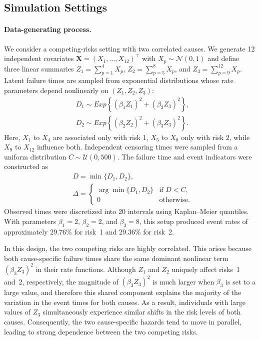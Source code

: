 \documentclass{article}
\theoremstyle{plain}
\theoremstyle{definition}
\theoremstyle{remark}
\begin{document}
\subsection{Simulation Settings}
\label{A.SimSettings}

\paragraph{Data-generating process.}
We consider a competing-risks setting with two correlated causes. We generate 12 independent covariates $\bm{X}=(X_1,\ldots,X_{12})^\top$ with $X_p\sim\mathcal{N}(0,1)$ and define three linear summaries
$Z_1=\sum_{p=1}^4 X_p$, $Z_2=\sum_{p=5}^8 X_p$, and $Z_3=\sum_{p=9}^{12} X_p$.
Latent failure times are sampled from exponential distributions whose rate parameters depend nonlinearly on $(Z_1,Z_2,Z_3)$:
\begin{align*}
    &D_1 \sim \mathit{Exp}\left\{ (\beta_1 Z_1)^2 + (\beta_3 Z_3)^2 \right\}, \\
    &D_2 \sim \mathit{Exp}\left\{ (\beta_2 Z_2)^2 + (\beta_3 Z_3)^2 \right\}. 
\end{align*}
Here, $X_1$ to $X_4$ are associated only with risk 1, $X_5$ to $X_8$ only with risk 2, while $X_9$ to $X_{12}$ influence both. Independent censoring times were sampled from a uniform distribution $C \sim \mathcal{U}(0, 500)$. The failure time and event indicators were constructed as
\begin{align*}
&D = \min\{D_1, D_2\},\\
&\Delta = 
\begin{cases}
    \arg\min\{D_1, D_2\} & \text{if } D < C, \\
    0 & \text{otherwise}.
\end{cases}
\end{align*}
Observed times were discretized into 20 intervals using Kaplan–Meier quantiles. With parameters $\beta_1=2$, $\beta_2=2$, and $\beta_3=8$, this setup produced event rates of approximately $29.76\%$ for risk~1 and $29.36\%$ for risk~2.

In this design, the two competing risks are highly correlated. 
This arises because both cause-specific failure times share the same  dominant nonlinear term $(\beta_3 Z_3)^2$ in their rate functions.
Although $Z_1$ and $Z_2$ uniquely affect risks~1 and~2, respectively, the magnitude of $(\beta_3 Z_3)^2$ is much larger when $\beta_3$ is set to a large value, and therefore this shared component explains the majority of the variation in the event times for both causes. 
As a result, individuals with large values of $Z_3$ simultaneously experience similar shifts in the risk levels of both causes. 
Consequently, the two cause-specific hazards tend to move in parallel, leading to strong dependence between the two competing risks.
\end{document}
